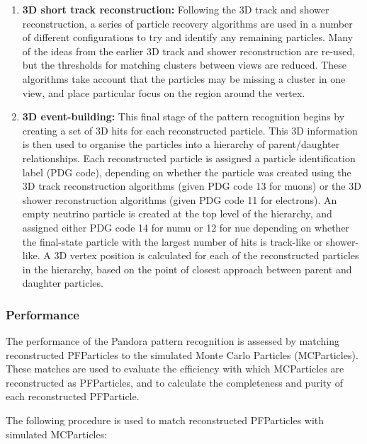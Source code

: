 \begin{enumerate}
\item{\bf 3D short track reconstruction:} Following the 3D track and shower reconstruction, a series of particle recovery algorithms are used in a number of different configurations to try and identify any remaining particles.  Many of the ideas from the earlier 3D track and shower reconstruction are re-used, but the thresholds for matching clusters between views are reduced. These algorithms take account that the particles may be missing a cluster in one view, and place particular focus on the region around the vertex.
\item{\bf 3D event-building:} This final stage of the pattern recognition begins by creating a set of 3D hits for each reconstructed particle. This 3D information is then used to organise the particles into a hierarchy of parent/daughter relationships. Each reconstructed particle is assigned a particle identification label (PDG code), depending on whether the particle was created using the 3D track reconstruction algorithms (given PDG code 13 for muons) or the 3D shower reconstruction algorithms (given PDG code 11 for electrons). An empty neutrino particle is created at the top level of the hierarchy, and assigned either PDG code 14 for numu or 12 for nue depending on whether the final-state particle with the largest number of hits is track-like or shower-like. A 3D vertex position is calculated for each of the reconstructed particles in the hierarchy, based on the point of closest approach between parent and daughter particles.
\end{enumerate}


\subsubsection{Performance}

The performance of the Pandora pattern recognition is assessed by matching reconstructed PFParticles to the simulated Monte Carlo Particles (MCParticles). These matches are used to evaluate the efficiency with which MCParticles are reconstructed as PFParticles, and to calculate the completeness and purity of each reconstructed PFParticle. 

The following procedure is used to match reconstructed PFParticles with simulated MCParticles:

